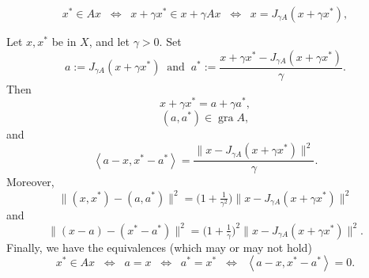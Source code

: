 \documentclass[10pt,a4paper]{amsart}
\newcommand{\gr}{\ensuremath{\operatorname{gra}}}
\newcommand{\scal}[2]{\left\langle{#1},{#2}  \right\rangle}
\begin{document}
\begin{equation}
\label{e:basic}
x^*\in Ax
\;\;\Leftrightarrow\;\;
x+\gamma x^* \in x+\gamma Ax
\;\;\Leftrightarrow\;\;
x = J_{\gamma A}(x+\gamma x^*),
\end{equation}

\begin{lemma}
\label{l:Minty}
Let $x,x^*$ be in $X$, and let $\gamma>0$. 
Set 
\begin{equation}
\label{M1}
a := J_{\gamma A}(x+\gamma x^*)
\;\;\text{and}\;\;
a^* := \frac{x+\gamma x^*-J_{\gamma A}(x+\gamma x^*)}{\gamma}.
\end{equation}
Then 
\begin{equation}
\label{M3}
x+\gamma x^* = a+\gamma a^*, 
\end{equation}
\begin{equation}
\label{M2}
(a,a^*)\in\gr A,
\end{equation}
and 
\begin{equation}
\label{e:key1}
\scal{a-x}{x^*-a^*} = \frac{\|x-J_{\gamma A}(x+\gamma x^*)\|^2}{\gamma}. 
\end{equation}
Moreover, 
\begin{equation}
\label{M6}
\|(x,x^*)-(a,a^*)\|^2 = \big(1+\tfrac{1}{\gamma^{2}}\big)\|x-J_{\gamma A}(x+\gamma x^*)\|^2 
\end{equation}
and 
\begin{equation}
\label{M8}
\big\|(x-a)-(x^*-a^*)\big\|^2 = \big( 1+ \tfrac{1}{\gamma}\big)^2\|x-J_{\gamma A}(x+\gamma x^*)\|^2. 
\end{equation}
Finally, we have the equivalences (which may or may not hold)
\begin{equation}
\label{e:key1=0}
x^*\in Ax
\;\;\Leftrightarrow\;\;
a=x
\;\;\Leftrightarrow\;\;
a^*=x^*
\;\;\Leftrightarrow\;\;
\scal{a-x}{x^*-a^*} = 0. 
\end{equation}
\end{lemma}
\end{document}
